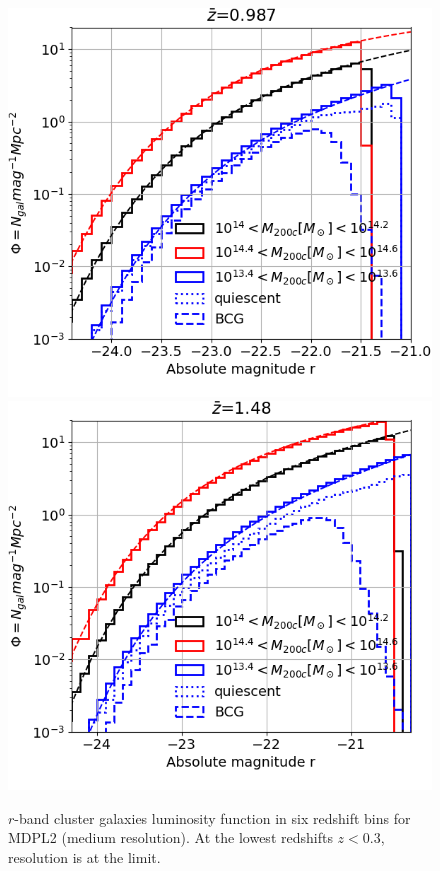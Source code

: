 \documentclass[fleqn,usenatbib,onecolumn]{mnras}
\begin{document}
\begin{figure}
\includegraphics[width=.6\columnwidth,type=png,ext=.png,read=.png]{figures/MD10_cluster_galaxy_LF_z_050320}
\includegraphics[width=.6\columnwidth,type=png,ext=.png,read=.png]{figures/MD10_cluster_galaxy_LF_z_040320}

\caption{\label{fig:optical:LF:MD10}$r$-band cluster galaxies luminosity function in six redshift bins for MDPL2 (medium resolution). At the lowest redshifts $z<0.3$, resolution is at the limit. }
\end{figure}
\end{document}
